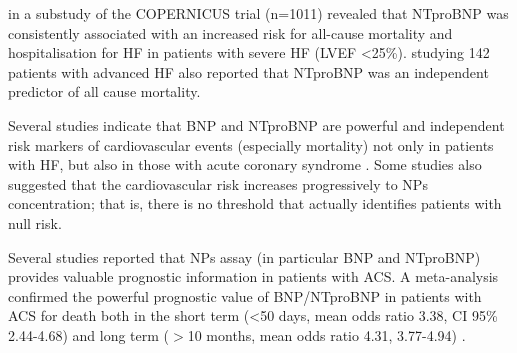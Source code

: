 \documentclass[14pt,a4paper,onecolumn]{extarticle}
\begin{document}

\citep{Hartmann2004} in a substudy of the COPERNICUS trial (n=1011) revealed that NTproBNP was consistently associated with an increased risk for all-cause mortality and hospitalisation for HF in patients with severe HF (LVEF <25\%). \citep{Gardner2003b} studying 142 patients with advanced HF also reported that NTproBNP was an independent predictor of all cause mortality.

Several studies indicate that BNP and NTproBNP are powerful and independent risk markers of cardiovascular events (especially mortality) not only in patients with HF, but also in those with acute coronary syndrome . Some studies also suggested that the cardiovascular risk increases progressively to NPs concentration; that is, there is no threshold that actually identifies patients with null risk. \citep{bib378}



Several studies reported that NPs assay (in particular BNP and NTproBNP) provides valuable prognostic information in patients with ACS. A meta-analysis confirmed the powerful prognostic value of BNP/NTproBNP in patients with ACS for death both in the short term (<50 days, mean odds ratio 3.38, CI 95\% 2.44-4.68) and long term ($>$10 months, mean odds ratio 4.31, 3.77-4.94) \citep{bib376}.

\end{document}
